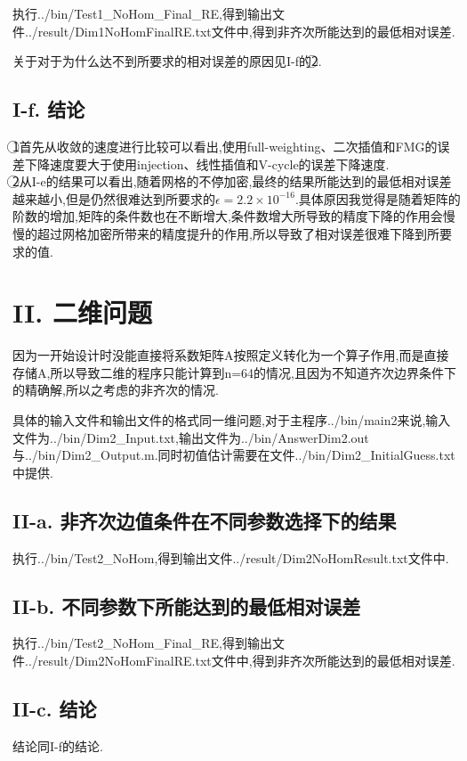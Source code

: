\documentclass[twoside,a4paper]{article}
\begin{document}
执行../bin/Test1\_NoHom\_Final\_RE,得到输出文件../result/Dim1NoHomFinalRE.txt文件中,得到非齐次所能达到的最低相对误差.

关于对于为什么达不到所要求的相对误差的原因见I-f的\textcircled{2}.

\subsection*{I-f. 结论}
\textcircled{1}首先从收敛的速度进行比较可以看出,使用full-weighting、二次插值和FMG的误差下降速度要大于使用injection、线性插值和V-cycle的误差下降速度.\\[2pt]
\textcircled{2}从I-e的结果可以看出,随着网格的不停加密,最终的结果所能达到的最低相对误差越来越小,但是仍然很难达到所要求的$\epsilon=2.2\times10^{-16}$.具体原因我觉得是随着矩阵的阶数的增加,矩阵的条件数也在不断增大,条件数增大所导致的精度下降的作用会慢慢的超过网格加密所带来的精度提升的作用,所以导致了相对误差很难下降到所要求的值.

\section*{II. 二维问题}
\hspace{0.9em}
因为一开始设计时没能直接将系数矩阵A按照定义转化为一个算子作用,而是直接存储A,所以导致二维的程序只能计算到n=64的情况,且因为不知道齐次边界条件下的精确解,所以之考虑的非齐次的情况.

具体的输入文件和输出文件的格式同一维问题,对于主程序../bin/main2来说,输入文件为../bin/Dim2\_Input.txt,输出文件为../bin/AnswerDim2.out与../bin/Dim2\_Output.m.同时初值估计需要在文件../bin/Dim2\_InitialGuess.txt中提供.

\subsection*{II-a. 非齐次边值条件在不同参数选择下的结果}
\hspace{0.9em}
执行../bin/Test2\_NoHom,得到输出文件../result/Dim2NoHomResult.txt文件中.

\subsection*{II-b. 不同参数下所能达到的最低相对误差}
\hspace{0.9em}
执行../bin/Test2\_NoHom\_Final\_RE,得到输出文件../result/Dim2NoHomFinalRE.txt文件中,得到非齐次所能达到的最低相对误差.

\subsection*{II-c. 结论}
\hspace{0.9em}
结论同I-f的结论.
\end{document}
